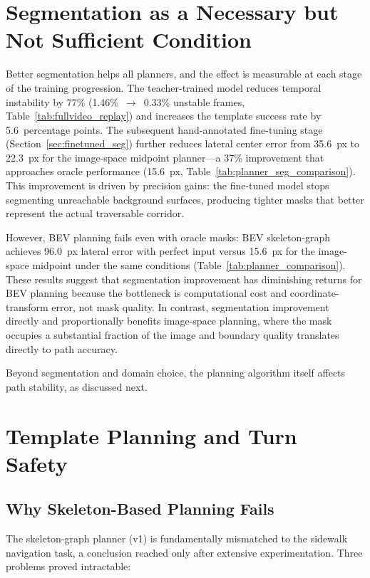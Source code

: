 \documentclass[12pt,letterpaper,oneside]{report}
\begin{document}
\section{Segmentation as a Necessary but Not Sufficient Condition}

Better segmentation helps all planners, and the effect is measurable at each stage of the training progression.  The teacher-trained model reduces temporal instability by 77\% (1.46\%~$\to$~0.33\% unstable frames, Table~\ref{tab:fullvideo_replay}) and increases the template success rate by 5.6~percentage points.  The subsequent hand-annotated fine-tuning stage (Section~\ref{sec:finetuned_seg}) further reduces lateral center error from 35.6~px to 22.3~px for the image-space midpoint planner---a 37\% improvement that approaches oracle performance (15.6~px, Table~\ref{tab:planner_seg_comparison}).  This improvement is driven by precision gains: the fine-tuned model stops segmenting unreachable background surfaces, producing tighter masks that better represent the actual traversable corridor.

However, BEV planning fails even with oracle masks: BEV skeleton-graph achieves 96.0~px lateral error with perfect input versus 15.6~px for the image-space midpoint under the same conditions (Table~\ref{tab:planner_comparison}).  These results suggest that segmentation improvement has diminishing returns for BEV planning because the bottleneck is computational cost and coordinate-transform error, not mask quality.  In contrast, segmentation improvement directly and proportionally benefits image-space planning, where the mask occupies a substantial fraction of the image and boundary quality translates directly to path accuracy.

Beyond segmentation and domain choice, the planning algorithm itself affects path stability, as discussed next.


\section{Template Planning and Turn Safety}

\subsection{Why Skeleton-Based Planning Fails}

The skeleton-graph planner (v1) is fundamentally mismatched to the sidewalk navigation task, a conclusion reached only after extensive experimentation.  Three problems proved intractable:
\end{document}
